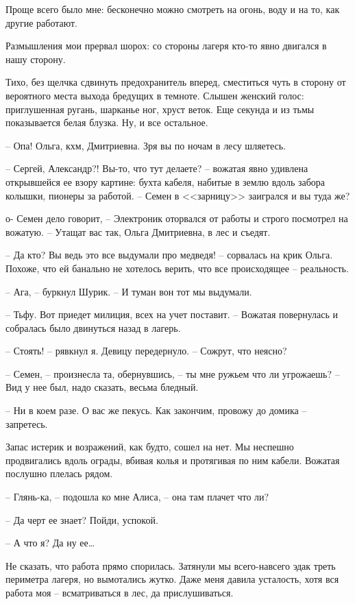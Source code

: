 \documentclass[a4paper]{book}
\begin{document}
Проще всего было мне: бесконечно можно смотреть на огонь, воду и на то, как другие работают.

Размышления мои прервал шорох: со стороны лагеря кто-то явно двигался в нашу сторону. 

Тихо, без щелчка сдвинуть предохранитель вперед, сместиться чуть в сторону от вероятного места выхода бредущих в темноте. Слышен женский голос: приглушенная ругань, шарканье ног, хруст веток. Еще секунда и из тьмы показывается белая блузка. Ну, и все остальное.

-- Опа! Ольга, кхм, Дмитриевна. Зря вы по ночам в лесу шляетесь. 

-- Сергей, Александр?! Вы-то, что тут делаете? -- вожатая явно удивлена открывшейся ее взору картине: бухта кабеля, набитые в землю вдоль забора колышки, пионеры за работой. -- Семен в <<зарницу>> заигрался и вы туда же?

о- Семен дело говорит, -- Электроник оторвался от работы и строго посмотрел на вожатую. -- Утащат вас так, Ольга Дмитриевна, в лес и съедят.

-- Да кто? Вы ведь это все выдумали про медведя! -- сорвалась на крик Ольга. Похоже, что ей банально не хотелось верить, что все происходящее -- реальность.

-- Ага, -- буркнул Шурик. -- И туман вон тот мы выдумали. 

-- Тьфу. Вот приедет милиция, всех на учет поставит. -- Вожатая повернулась и собралась было двинуться назад в лагерь. 

-- Стоять! -- рявкнул я. Девицу передернуло. -- Сожрут, что неясно? 

-- Семен, -- произнесла та, обернувшись, -- ты мне ружьем что ли угрожаешь? -- Вид у нее был, надо сказать, весьма бледный.

-- Ни в коем разе. О вас же пекусь. Как закончим, провожу до домика -- запретесь.

Запас истерик и возражений, как будто, сошел на нет. Мы неспешно продвигались вдоль ограды, вбивая колья и протягивая по ним кабели. Вожатая послушно плелась рядом. 

-- Глянь-ка, -- подошла ко мне Алиса, -- она там плачет что ли?

-- Да черт ее знает? Пойди, успокой.

-- А что я? Да ну ее\ldots

Не сказать, что работа прямо спорилась. Затянули мы всего-навсего эдак треть периметра лагеря,  но вымотались жутко. Даже меня давила усталость, хотя вся работа моя -- всматриваться в лес, да прислушиваться. 
\end{document}

